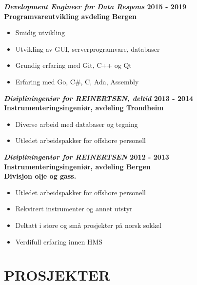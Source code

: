 \documentclass[margin, 10pt, norsk]{res} %
\begin{document}
\begin{resume}
\textbf{\emph{Development Engineer for Data Respons} \hfill 2015 - 2019\\
Programvareutvikling avdeling Bergen}

\begin{itemize} \itemsep -2pt %
\item Smidig utvikling
\item Utvikling av GUI, serverprogramvare, databaser
\item Grundig erfaring med Git, C++ og Qt
\item Erfaring med Go, C\#, C, Ada, Assembly
\end{itemize}

\textbf{\emph{Disipliningeniør for REINERTSEN, deltid} \hfill 2013 - 2014\\
Instrumenteringsingeniør, avdeling Trondheim}

\begin{itemize} \itemsep -2pt %
\item Diverse arbeid med databaser og tegning
\item Utledet arbeidspakker for offshore personell 
\end{itemize}

\textbf{\emph{Disipliningeniør for REINERTSEN} \hfill 2012 - 2013 \\
Instrumenteringsingeniør, avdeling Bergen\\
Divisjon olje og gass.}
\begin{itemize} \itemsep -2pt %
\item Utledet arbeidspakker for offshore personell 
\item Rekvirert instrumenter og annet utstyr
\item Deltatt i store og små prosjekter på norsk sokkel
\item Verdifull erfaring innen HMS
\end{itemize}

\newpage

\hspace{5mm} 

\section{PROSJEKTER}


\end{resume}
\end{document}
